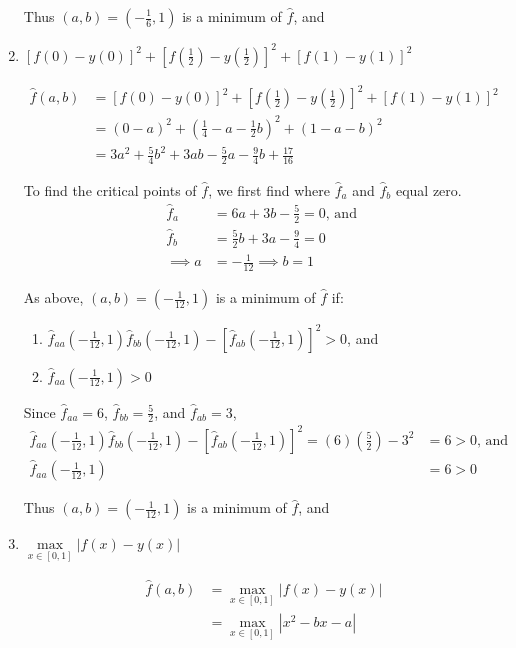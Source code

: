 \documentclass[12pt]{article}
\begin{document}
\begin{enumerate}[\ \ (a)\ \ ]
Thus $(a,b) = (-\frac{1}{6}, 1)$ is a minimum of $\hat{f}$, and 

\item {\it $[f(0) - y(0)]^2 + [f(\frac{1}{2}) - y(\frac{1}{2})]^2 + [f(1) - y(1)]^2$}
\begin{align*}
\hat{f}(a,b) &= [f(0) - y(0)]^2 + [f(\frac{1}{2}) - y(\frac{1}{2})]^2 + [f(1) - y(1)]^2 \\
&= (0 - a)^2 + (\tfrac{1}{4} - a - \tfrac{1}{2}b)^2 + (1 - a - b)^2 \\
&= 3a^2 + \tfrac{5}{4}b^2 + 3ab -\tfrac{5}{2}a - \tfrac{9}{4}b + \tfrac{17}{16}
\end{align*}

To find the critical points of $\hat{f}$, we first find where $\hat{f}_{a}$ and $\hat{f}_{b}$ equal zero.
\begin{align*}
\hat{f}_{a} &= 6a + 3b - \tfrac{5}{2} = 0 \text{, and } \\
\hat{f}_{b} &= \tfrac{5}{2}b + 3a - \tfrac{9}{4} = 0 \\
\implies a &= -\tfrac{1}{12} \implies b = 1
\end{align*}

As above, $(a,b) = (-\frac{1}{12}, 1)$ is a minimum of $\hat{f}$ if:
\begin{enumerate}[\ \ (I)\ \ ]
\item $\hat{f}_{aa}(-\frac{1}{12}, 1)\hat{f}_{bb}(-\frac{1}{12}, 1) - \left[\hat{f}_{ab}(-\frac{1}{12}, 1)\right]^2 > 0$, and
\item $\hat{f}_{aa}(-\frac{1}{12}, 1) > 0$
\end{enumerate}

Since $\hat{f}_{aa} = 6$, $\hat{f}_{bb} = \tfrac{5}{2}$, and $\hat{f}_{ab} = 3$,
\begin{align*}
\hat{f}_{aa}(-\frac{1}{12}, 1)\hat{f}_{bb}(-\frac{1}{12}, 1) - \left[\hat{f}_{ab}(-\frac{1}{12}, 1)\right]^2 = (6)(\tfrac{5}{2}) - 3^2 &= 6 > 0 \text{, and } \\
\hat{f}_{aa}(-\frac{1}{12}, 1) &= 6 > 0
\end{align*}

Thus $(a,b) = (-\tfrac{1}{12}, 1)$ is a minimum of $\hat{f}$, and 

\item {\it $\max\limits_{x\in[0,1]}|f(x) - y(x)|$}
\begin{align*}
\hat{f}(a,b) &= \max\limits_{x\in[0,1]}|f(x) - y(x)| \\
&= \max\limits_{x\in[0,1]}|x^2 - bx - a| \\
\end{align*}


\end{enumerate}
\end{document}
